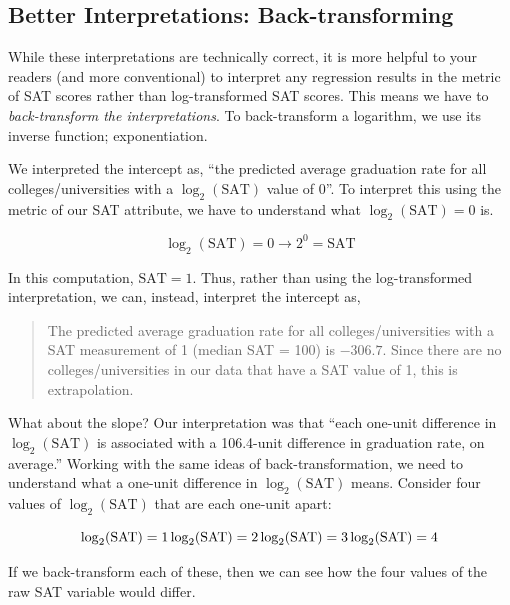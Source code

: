 \documentclass[]{book}
\begin{document}
\hypertarget{better-interpretations-back-transforming}{%
\subsection{Better Interpretations: Back-transforming}\label{better-interpretations-back-transforming}}

While these interpretations are technically correct, it is more helpful to your readers (and more conventional) to interpret any regression results in the metric of SAT scores rather than log-transformed SAT scores. This means we have to \emph{back-transform the interpretations}. To back-transform a logarithm, we use its inverse function; exponentiation.

We interpreted the intercept as, ``the predicted average graduation rate for all colleges/universities with a \(\log_2(\mathrm{SAT})\) value of 0''. To interpret this using the metric of our SAT attribute, we have to understand what \(\log_2(\mathrm{SAT}) = 0\) is.

\[
\log_2 (\mathrm{SAT}) = 0 \longrightarrow 2^{0} = \mathrm{SAT}
\]

In this computation, \(\mathrm{SAT}=1\). Thus, rather than using the log-transformed interpretation, we can, instead, interpret the intercept as,

\begin{quote}
The predicted average graduation rate for all colleges/universities with a SAT measurement of 1 (median SAT = 100) is \(-306.7\). Since there are no colleges/universities in our data that have a SAT value of 1, this is extrapolation.
\end{quote}

What about the slope? Our interpretation was that ``each one-unit difference in \(\log_2(\mathrm{SAT})\) is associated with a 106.4-unit difference in graduation rate, on average.'' Working with the same ideas of back-transformation, we need to understand what a one-unit difference in \(\log_2(\mathrm{SAT})\) means. Consider four values of \(\log_2(\mathrm{SAT})\) that are each one-unit apart:

\[
\log_2(\mathrm{SAT}) = 1\\
\log_2(\mathrm{SAT}) = 2\\
\log_2(\mathrm{SAT}) = 3\\
\log_2(\mathrm{SAT}) = 4
\]

If we back-transform each of these, then we can see how the four values of the raw SAT variable would differ.
\end{document}
